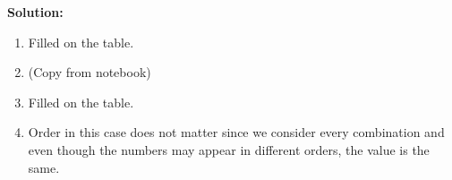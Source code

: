 \documentclass[9pt]{article}
\begin{document}
\textbf{Solution:} \\
\begin{enumerate}
  \item Filled on the table.
  \item (Copy from notebook)
  \item Filled on the table.
  \item Order in this case does not matter since we consider every combination and even though the numbers may appear in different orders, the value is the same.
\end{enumerate}



\fi
\newpage

\phantom{Test}

\vspace{5mm}
\end{document}
